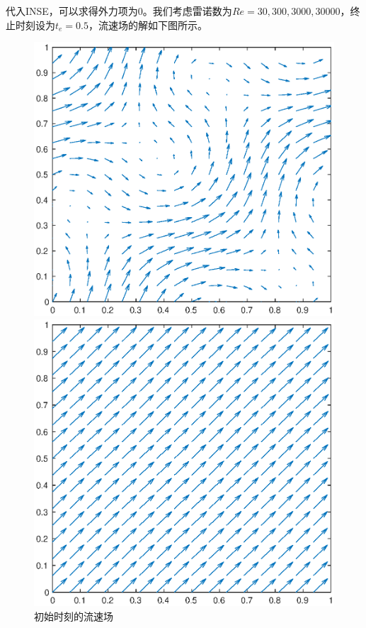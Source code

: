 \documentclass[lang=cn,10pt,bibend=bibtex]{elegantbook}
\begin{document}
代入INSE，可以求得外力项为0。我们考虑雷诺数为$Re=30,300,3000,30000$，终止时刻设为$t_e=0.5$，流速场的解如下图所示。

\vspace{-1em}
\begin{figure}[H]
  \centering
  \begin{minipage}[c]{0.49\linewidth}
      \centering
      \includegraphics[width=0.9\linewidth]{figure/test3_init.eps}
      \caption*{初始时刻的流速场}
  \end{minipage}
  \begin{minipage}[c]{0.49\linewidth}
    \begin{minipage}[t]{0.49\linewidth}
      \centering
      \includegraphics[width=0.95\linewidth]{figure/test3_Re=30.eps}

\end{minipage}
\end{minipage}
\end{figure}
\end{document}
